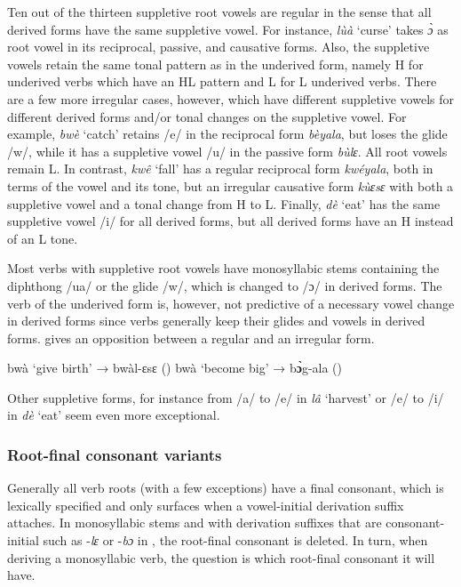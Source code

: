 Ten out of the thirteen suppletive root vowels are regular in the sense that all derived forms have the same suppletive vowel. For instance, {\itshape lùà} `curse' takes {\itshape ɔ̀} as root vowel in its reciprocal, passive, and causative forms. Also, the suppletive vowels retain the same tonal pattern as in the underived form, namely H for underived verbs which have an HL pattern and L for L underived verbs. There are a few more irregular cases, however, which have different suppletive vowels for different derived forms and/or tonal changes on the suppletive vowel.  For example, {\itshape bwè} `catch' retains /e/ in the reciprocal form {\itshape bèyala}, but loses the glide /w/, while it has a suppletive vowel /u/ in the passive form {\itshape bùlɛ}. All root vowels remain L. In contrast, {\itshape kwê} `fall' has a regular reciprocal form {\itshape kwéyala}, both in terms of the vowel and its tone, but an irregular causative form {\itshape kùɛsɛ} with both a suppletive vowel and a tonal change from H to L. Finally, {\itshape dè} `eat' has the same suppletive vowel /i/ for all derived forms, but all derived forms have an H instead of an L tone.

Most verbs with suppletive root vowels have monosyllabic stems containing the diphthong /ua/ or the glide /w/, which is changed to /ɔ/ in derived forms. The verb of the underived form is, however, not predictive of a necessary vowel change in derived forms since verbs generally keep their glides and vowels in derived forms.  gives an opposition between a regular and an irregular form.

\ea \label{SRV1}
  \ea  bwà `give birth' → bwàl-ɛsɛ ({\CAUS})
\ex bwà `become big' → b{\bfseries ɔ̀}g-ala ({\RECIP})
\z
\z

\noindent Other suppletive forms, for instance from /a/ to /e/ in {\itshape lâ} `harvest' or /e/ to /i/ in {\itshape dè} `eat' seem even more exceptional.



\subsubsection{Root-final consonant variants}
\label{sec:RFCV}

Generally all verb roots (with a few exceptions) have a final consonant, which is lexically specified and only surfaces when a vowel-initial derivation suffix attaches. In monosyllabic stems  and with derivation suffixes that are consonant-initial such as -{\itshape lɛ} or -{\itshape bɔ} in , the root-final consonant is deleted. In turn, when deriving a monosyllabic verb, the question is which root-final consonant it will have.

